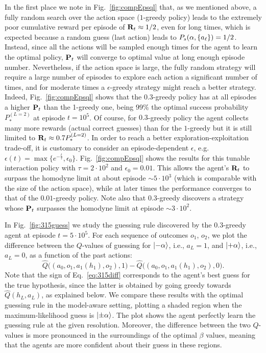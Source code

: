 In the first place we note in Fig.~\ref{fig:compEpsql} that, as we mentioned above, a fully random search over the action space ($1$-greedy policy) leads to the extremely poor cumulative reward per episode of $\mathbf{R}_{t}\approx 1/2$, even for long times, which is expected because a random guess (last action) leads to $P_s(\alpha, \lbrace a_\ell\rbrace)=1/2$. Instead, since all the actions will be sampled enough times for the agent to learn the optimal policy, $\mathbf{P}_{t}$  will converge to optimal value at long enough episode number. Nevertheless, if the action space is large, the fully random strategy will require a large number of episodes to explore each action a significant number of times, and for moderate times a $\epsilon$-greedy strategy might reach a better strategy. Indeed, Fig.~\ref{fig:compEpsql} shows that the $0.3$-greedy policy has at all episodes a higher $\mathbf{P}_{t}$ than the 1-greedy one, being $99\% $ the optimal success probability $P_*^{(L=2)}$ at episode $t=10^{5}$.
Of course, for $0.3$-greedy policy the agent collects many more rewards (actual correct guesses) than for the $1$-greedy  but it is still limited to $\mathbf{R}_{t}\approx 0.7 P_{*}^{(L=2)}$. In order to reach a better exploration-exploitation trade-off, it is customary to consider an episode-dependent $\epsilon$, e.g. $\epsilon (t)=\max\{e^{-\frac{t}{\tau}},\epsilon_0\}$. Fig.~\ref{fig:compEpsql} shows the results for this tunable interaction policy with $\tau = 2 \cdot  10^{2}$ and $\epsilon_0 = 0.01$.
This allows the agent's $\mathbf{R}_{t}$ to surpass the homodyne limit at about episode $\sim 5 \cdot 10^{3}$ (which is comparable with the size of the action space), while at later times the performance converges to that of the $0.01$-greedy policy. Note also that $0.3$-greedy discovers a strategy whose $\mathbf{P}_{t}$ surpasses the homodyne limit at episode $\sim 3 \cdot 10^{2}$.

In Fig.~\ref{fig:315guess} we study the guessing rule discovered by the $0.3$-greedy agent at episode $t= 5 \cdot 10^{5}$. For each sequence of outcomes $o_{1}$, $o_{2}$, we plot the difference between the $Q$-values of guessing for $\ket{-\alpha}$, i.e., $a_{L}=1$, and $\ket{+\alpha}$, i.e., $a_{L}=0$, as a function of the past actions:
\begin{equation}\label{eq:315diff}
\hat{Q} \big( (a_0,o_{1},a_1(h_1),o_{2}),1 \big)-\hat{Q} \big( (a_0,o_{1},a_1(h_1),o_{2}),0 \big).
\end{equation}
Note that the sign of Eq.~\eqref{eq:315diff} corresponds to the agent's best guess for the true hypothesis, since the latter is obtained by going greedy towards $\hat{Q}(h_L,a_L)$, as explained below. We compare these results with the optimal guessing rule in the model-aware setting, plotting a shaded region when the maximum-likelihood guess is $\ket{\pm\alpha}$. The plot shows the agent perfectly learn the guessing rule at the given resolution. Moreover, the difference between the two $Q$-values is more pronounced in the surroundings of the optimal $\beta$ values, meaning that the agents are more confident about their guess in these regions.

